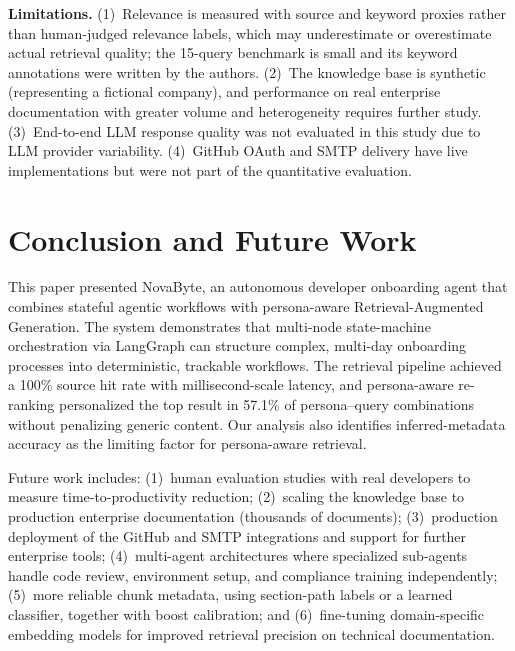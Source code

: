 \documentclass[conference]{IEEEtran}
\begin{document}
\smallskip
\noindent\textbf{Limitations.} (1)~Relevance is measured with source and keyword proxies rather than human-judged relevance labels, which may underestimate or overestimate actual retrieval quality; the 15-query benchmark is small and its keyword annotations were written by the authors. (2)~The knowledge base is synthetic (representing a fictional company), and performance on real enterprise documentation with greater volume and heterogeneity requires further study. (3)~End-to-end LLM response quality was not evaluated in this study due to LLM provider variability. (4)~GitHub OAuth and SMTP delivery have live implementations but were not part of the quantitative evaluation.

\section{Conclusion and Future Work}

This paper presented NovaByte, an autonomous developer onboarding agent that combines stateful agentic workflows with persona-aware Retrieval-Augmented Generation. The system demonstrates that multi-node state-machine orchestration via LangGraph can structure complex, multi-day onboarding processes into deterministic, trackable workflows. The retrieval pipeline achieved a 100\% source hit rate with millisecond-scale latency, and persona-aware re-ranking personalized the top result in 57.1\% of persona--query combinations without penalizing generic content. Our analysis also identifies inferred-metadata accuracy as the limiting factor for persona-aware retrieval.

Future work includes: (1)~human evaluation studies with real developers to measure time-to-productivity reduction; (2)~scaling the knowledge base to production enterprise documentation (thousands of documents); (3)~production deployment of the GitHub and SMTP integrations and support for further enterprise tools; (4)~multi-agent architectures where specialized sub-agents handle code review, environment setup, and compliance training independently; (5)~more reliable chunk metadata, using section-path labels or a learned classifier, together with boost calibration; and (6)~fine-tuning domain-specific embedding models for improved retrieval precision on technical documentation.

\end{document}
